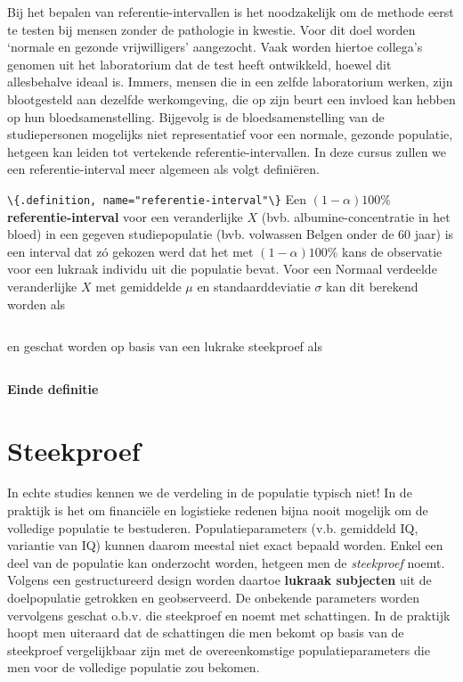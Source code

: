 \documentclass[
  12pt,dutch,coursenotes]{book}
\newcommand{\passthrough}[1]{#1}
\begin{document}
Bij het bepalen van referentie-intervallen is het noodzakelijk om de methode
eerst te testen bij mensen zonder de pathologie in kwestie. Voor dit doel
worden `normale en gezonde vrijwilligers' aangezocht. Vaak worden hiertoe
collega's genomen uit het laboratorium dat de test heeft ontwikkeld, hoewel
dit allesbehalve ideaal is. Immers, mensen die in een zelfde laboratorium
werken, zijn blootgesteld aan dezelfde werkomgeving, die op zijn beurt een
invloed kan hebben op hun bloedsamenstelling. Bijgevolg is de
bloedsamenstelling van de studiepersonen mogelijks niet representatief voor
een normale, gezonde populatie, hetgeen kan leiden tot vertekende
referentie-intervallen. In deze cursus zullen we een referentie-interval
meer algemeen als volgt definiëren.

\passthrough{\lstinline!\{.definition, name="referentie-interval"\}!}
Een \textbf{\((1-\alpha)100\%\) referentie-interval}
voor een veranderlijke \(X\) (bvb. albumine-concentratie
in het bloed) in een gegeven studiepopulatie (bvb. volwassen Belgen onder de
60 jaar) is een interval dat zó gekozen werd dat het met \((1-\alpha)100\%\)
kans de observatie voor een lukraak individu uit die populatie bevat. Voor
een Normaal verdeelde veranderlijke \(X\) met gemiddelde \(\mu\) en
standaarddeviatie \(\sigma\) kan dit berekend worden als

\begin{equation*}
[\mu-z_{\alpha/2}\sigma,\mu+z_{\alpha/2}\sigma]
\end{equation*}

en geschat worden op basis van een lukrake steekproef als

\begin{equation*}
[\bar x-z_{\alpha/2}s_x,\bar x+z_{\alpha/2}s_x]
\end{equation*}

\textbf{Einde definitie}

\hypertarget{steekproef}{%
\section{Steekproef}\label{steekproef}}

In echte studies kennen we de verdeling in de populatie typisch niet!
In de praktijk is het om financiële en logistieke redenen bijna nooit mogelijk om de
volledige populatie te bestuderen. Populatieparameters (v.b. gemiddeld IQ, variantie van IQ) kunnen daarom meestal
niet exact bepaald worden. Enkel een deel van de populatie kan onderzocht
worden, hetgeen men de \emph{steekproef} noemt. Volgens een
gestructureerd design worden daartoe \textbf{lukraak subjecten} uit de doelpopulatie
getrokken en geobserveerd. De onbekende parameters worden vervolgens geschat
o.b.v. die steekproef en noemt met schattingen. In de praktijk hoopt men uiteraard dat de schattingen die men bekomt op basis van de steekproef vergelijkbaar zijn met de overeenkomstige populatieparameters die men voor de volledige populatie zou bekomen.
\end{document}
